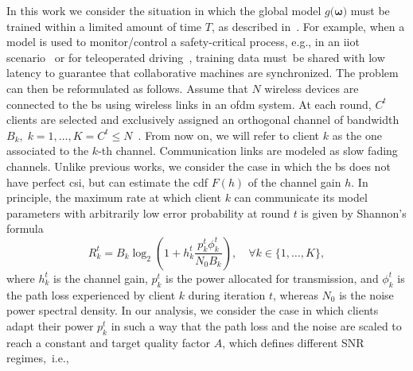 \documentclass[10pt, conference, letterpaper]{IEEEtran}
\begin{document}
	
	In this work we consider the situation in which the global model $g(\bm{\omega)}$ must be trained within a limited amount of time $T$, as described in~\cite{Buyukates2020}. For example, when a model is used to monitor/control a safety-critical process, e.g., in an \gls{iiot} scenario~\cite{Savazzi2021} or for teleoperated driving~\cite{zugno2020toward}, training data must be shared with low latency to guarantee that collaborative machines are synchronized.
	The problem can then be reformulated as follows.
	Assume that  $N$ wireless devices are connected to the \gls{bs} using wireless links in an \gls{ofdm} system. At each round, $C^t$ clients are selected and exclusively assigned an orthogonal channel of  bandwidth $B_k, \; k=1,\dots, K=C^t \leq N$~\cite{wadu2020federated,Chen2020TW}. From now on, we will refer to client $k$ as the one associated to the $k$-th channel.
	Communication links are modeled as slow fading channels. Unlike previous works, we consider the case in which the \gls{bs} does not have perfect \gls{csi}, but can estimate the \gls{cdf} $F(h)$ of the channel gain $h$.
	In principle, the maximum rate at which client $k$ can communicate its model parameters with arbitrarily low error probability at round $t$ is given by Shannon's formula
	\begin{equation}
		R_k^t = B_k \log_2\left(1 + h_k^t \frac{p_k^t \phi_k^t}{N_0 B_k}\right), \quad \forall k \in \{1, \dots, K\},
	\end{equation}  
	where $h_k^t$ is the channel gain, $p_k^t$ is the power allocated for transmission, and $\phi_k^t$ is the path loss experienced by client $k$ during iteration $t$, whereas $N_0$ is the noise power spectral density. 
	In our analysis, we consider the case in which clients adapt their power $p_k^t$ in such a way that the path loss and the noise are scaled to reach a constant and target quality factor $A$, which defines different SNR regimes,~i.e.,
\end{document}
